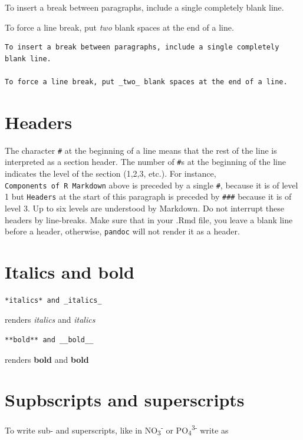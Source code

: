 \documentclass[]{book}
\theoremstyle{definition}
\theoremstyle{definition}
\theoremstyle{definition}
\theoremstyle{remark}
\begin{document}
To insert a break between paragraphs, include a single completely blank
line.

To force a line break, put \emph{two} blank spaces at the end of a line.

\begin{verbatim}
To insert a break between paragraphs, include a single completely blank line.

To force a line break, put _two_ blank spaces at the end of a line.
\end{verbatim}

\section{Headers}\label{headers}

The character \texttt{\#} at the beginning of a line means that the rest
of the line is interpreted as a section header. The number of
\texttt{\#}s at the beginning of the line indicates the level of the
section (1,2,3, etc.). For instance,
\texttt{Components\ of\ R\ Markdown} above is preceded by a single
\texttt{\#}, because it is of level 1 but \texttt{Headers} at the start
of this paragraph is preceded by \texttt{\#\#\#} because it is of level
3. Up to six levels are understood by Markdown. Do not interrupt these
headers by line-breaks. Make sure that in your .Rmd file, you leave a
blank line before a header, otherwise, \texttt{pandoc} will not render
it as a header.

\section{Italics and bold}\label{italics-and-bold}

\begin{verbatim}
*italics* and _italics_
\end{verbatim}

renders \emph{italics} and \emph{italics}

\begin{verbatim}
**bold** and __bold__
\end{verbatim}

renders \textbf{bold} and \textbf{bold}

\section{Supbscripts and
superscripts}\label{supbscripts-and-superscripts}

To write sub- and superscripts, like in
NO\textsubscript{3}\textsuperscript{-} or
PO\textsubscript{4}\textsuperscript{3-} write as
\end{document}

